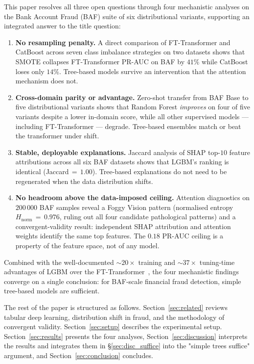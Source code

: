 \documentclass[a4paper,fleqn]{cas-sc}
\begin{document}
This paper resolves all three open questions through four mechanistic
analyses on the Bank Account Fraud (BAF) suite of six distributional
variants, supporting an integrated answer to the title question:
\begin{enumerate}[label=C\arabic*.]
  \item \textbf{No resampling penalty.} A direct comparison of FT-Transformer
    and CatBoost across seven class imbalance strategies on two datasets
    shows that SMOTE collapses FT-Transformer PR-AUC on BAF by $41\%$ while
    CatBoost loses only $14\%$. Tree-based models survive an intervention that
    the attention mechanism does not.
  \item \textbf{Cross-domain parity or advantage.} Zero-shot transfer from
    BAF Base to five distributional variants shows that Random Forest
    \emph{improves} on four of five variants despite a lower in-domain score,
    while all other supervised models --- including FT-Transformer --- degrade.
    Tree-based ensembles match or beat the transformer under shift.
  \item \textbf{Stable, deployable explanations.} Jaccard analysis of SHAP top-$10$
    feature attributions across all six BAF datasets shows that LGBM's ranking
    is identical (Jaccard\,$=\,1.00$). Tree-based explanations do not need
    to be regenerated when the data distribution shifts.
  \item \textbf{No headroom above the data-imposed ceiling.} Attention
    diagnostics on $200\,000$ BAF samples reveal a Foggy Vision pattern
    (normalised entropy $H_{\text{norm}}\,=\,0.976$, ruling out all four
    candidate pathological patterns) and a convergent-validity result:
    independent SHAP attribution and attention weights identify the same top
    features. The $0.18$ PR-AUC ceiling is a property of the feature space,
    not of any model.
\end{enumerate}
Combined with the well-documented $\sim 20\times$ training and $\sim 37\times$
tuning-time advantages of LGBM over the FT-Transformer~\citep{caixeiro2025threshold},
the four mechanistic findings converge on a single conclusion: for BAF-scale
financial fraud detection, simple tree-based models are sufficient.

The rest of the paper is structured as follows.
Section~\ref{sec:related} reviews tabular deep learning, distribution shift
in fraud, and the methodology of convergent validity.
Section~\ref{sec:setup} describes the experimental setup.
Section~\ref{sec:results} presents the four analyses,
Section~\ref{sec:discussion} interprets the results and integrates them in
\S\ref{sec:disc_suffice} into the "simple trees suffice" argument, and
Section~\ref{sec:conclusion} concludes.
\end{document}
